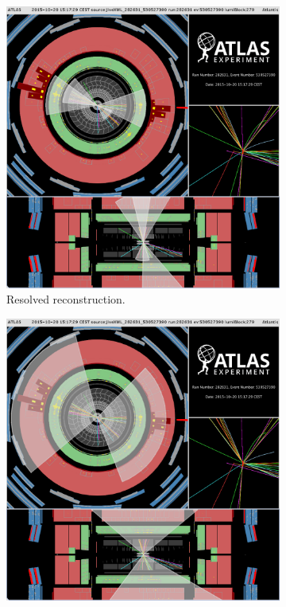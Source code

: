 \begin{figure}[h!]
\centering
\captionsetup{justification=centering}
    \begin{subfigure}[b]{0.45\textwidth}
        \includegraphics[width=\textwidth]{figures/object/JiveXML_282631_530527390-YX-RZ-YZ-EventInfo-2016-02-29-15-48-39}
        \caption{Resolved reconstruction.}
        \label{fig:obj_evt_display_resolved}
    \end{subfigure}
    \quad
    \begin{subfigure}[b]{0.45\textwidth}
        \includegraphics[width=\textwidth]{figures/object/JiveXML_282631_530527390-YX-RZ-YZ-EventInfo-2016-02-29-15-48-08}

\end{subfigure}
\end{figure}
